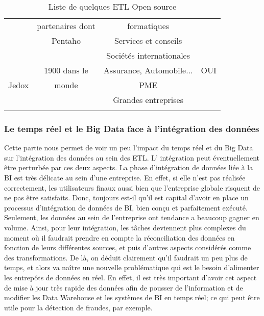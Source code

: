 \documentclass[12pt,a4wide,twoside]{report}
\begin{document}
\begin{table}
\begin{center}
\begin{tabular}{|c|c|c|c|}
					&partenaires dont &formatiques &\\
					&Pentaho &Services et conseils &\\
					& &Sociétés internationales & \\				
					\hline					
					\multirow{3}{2cm}{Jedox}&1900 dans le&Assurance, Automobile... &OUI\\
					&monde \cite{misc11}  &PME &\\
					& &Grandes entreprises &\\
					& & & \\
					\hline				
					\end{tabular}
					\end{center}
					\caption{Liste de quelques ETL Open source}
					
					\end{table} \newline
			

\subsubsection{Le temps réel et le Big Data	face à l'intégration des données}
	Cette partie nous permet de voir un peu l'impact du temps réel et du Big Data sur l'intégration des données au sein des ETL. L' intégration peut éventuellement être perturbée par ces deux aspects. \newline
	La phase d'intégration de données liée à la BI est très délicate au sein d'une entreprise. En effet, si elle n'est pas réalisée correctement, les utilisateurs finaux aussi bien que l'entreprise globale risquent de ne pas être satisfaits. Donc, toujours est-il qu'il est capital d’avoir en place un processus d’intégration de données de BI, bien conçu et parfaitement exécuté.\newline
	Seulement, les données au sein de l'entreprise ont tendance a beaucoup gagner en volume. Ainsi, pour leur intégration, les tâches deviennent plus complexes du moment où il faudrait prendre en compte la réconciliation des données en fonction de leurs différentes sources, et puis d'autres aspects considérés comme des transformations. De là, on déduit clairement qu'il faudrait un peu plus de temps, et alors va naître une nouvelle problématique qui est le besoin d'alimenter les entrepôts de données en réel. En effet, il est très important d'avoir cet aspect de mise à jour très rapide des données afin de  pousser de l’information et de modifier les Data Warehouse et les systèmes de BI en temps réel; \newline
	ce qui peut être utile pour la détection de fraudes, par exemple. 
\end{document}
